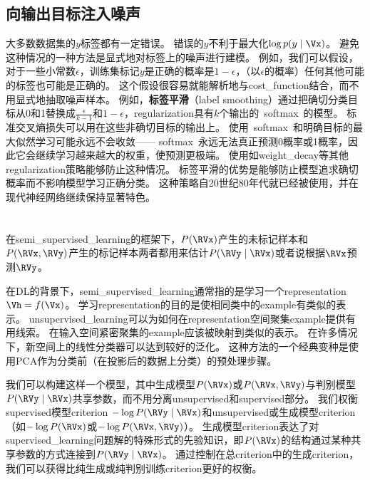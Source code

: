 
\subsection{向输出目标注入噪声}
\label{sec:injecting_noise_at_the_output_targets}
大多数数据集的$y$标签都有一定错误。
错误的$y$不利于最大化$\log p(y \mid \Vx)$。
避免这种情况的一种方法是显式地对标签上的噪声进行建模。
例如，我们可以假设，对于一些小常数$\epsilon$，训练集标记$y$是正确的概率是$1-\epsilon$，（以$\epsilon$的概率）任何其他可能的标签也可能是正确的。
这个假设很容易就能解析地与\gls{cost_function}结合，而不用显式地抽取噪声样本。
例如，\textbf{标签平滑}（label smoothing）通过把确切分类目标从0和1替换成$\frac{\epsilon}{k-1}$和$1-\epsilon$，\gls{regularization}具有$k$个输出的~\gls{softmax}~的模型。
标准交叉熵损失可以用在这些非确切目标的输出上。
使用~\gls{softmax}~和明确目标的最大似然学习可能永远不会收敛——
\gls{softmax}~永远无法真正预测0概率或1概率，因此它会继续学习越来越大的权重，使预测更极端。
使用如\gls{weight_decay}等其他\gls{regularization}策略能够防止这种情况。
标签平滑的优势是能够防止模型追求确切概率而不影响模型学习正确分类。
这种策略自20世纪80年代就已经被使用，并在现代神经网络继续保持显著特色\citep{Szegedy-et-al-2015}。


\section{}
\label{sec:semi_supervised_learning}
在\gls{semi_supervised_learning}的框架下，$P(\RVx)$产生的未标记样本和$P(\RVx, \RVy)$产生的标记样本两者都用来估计$P(\RVy \mid \RVx)$或者说根据$\RVx$预测$\RVy$。

在\gls{DL}的背景下，\gls{semi_supervised_learning}通常指的是学习一个\gls{representation} $\Vh = f(\Vx)$。 
学习\gls{representation}的目的是使相同类中的\gls{example}有类似的表示。
\gls{unsupervised_learning}可以为如何在\gls{representation}空间聚集\gls{example}提供有用线索。
在输入空间紧密聚集的\gls{example}应该被映射到类似的表示。
在许多情况下，新空间上的线性分类器可以达到较好的泛化\citep{Belkin+Niyogi-2002,Chapelle+al-2003}。
这种方法的一个经典变种是使用\gls{PCA}作为分类前（在投影后的数据上分类）的预处理步骤。

我们可以构建这样一个模型，其中生成模型$P(\RVx)$或$P(\RVx, \RVy)$与判别模型$P(\RVy \mid \RVx)$共享参数，而不用分离\gls{unsupervised}和\gls{supervised}部分。
我们权衡\gls{supervised}模型\gls{criterion} $-\log P(\RVy \mid \RVx)$和\gls{unsupervised}或生成模型\gls{criterion}（如$-\log P(\RVx)$或$-\log P(\RVx, \RVy)$）。
生成模型\gls{criterion}表达了对\gls{supervised_learning}问题解的特殊形式的先验知识\citep{LasserreJ2006}，即$P(\RVx)$的结构通过某种共享参数的方式连接到$P(\RVy \mid \RVx)$。
通过控制在总\gls{criterion}中的生成\gls{criterion}，我们可以获得比纯生成或纯判别训练\gls{criterion}更好的权衡\citep{LasserreJ2006,Larochelle+Bengio-2008-small}。

